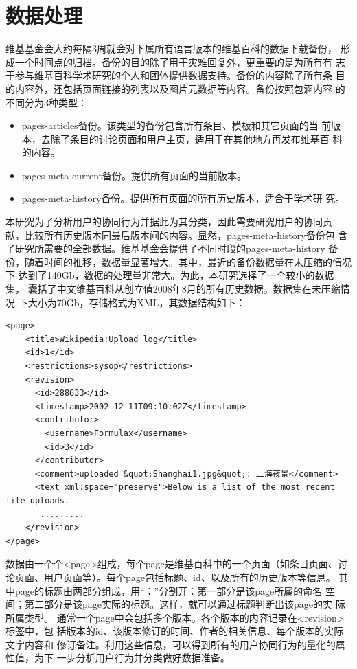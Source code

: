 \section{数据处理}
\label{sec:wikimedia-data}

维基基金会大约每隔3周就会对下属所有语言版本的维基百科的数据下载备份，
形成一个时间点的归档。备份的目的除了用于灾难回复外，更重要的是为所有有
志于参与维基百科学术研究的个人和团体提供数据支持。备份的内容除了所有条
目的内容外，还包括页面链接的列表以及图片元数据等内容。备份按照包涵内容
的不同分为3种类型：
\begin{itemize}
\item pages-articles备份。该类型的备份包含所有条目、模板和其它页面的当
  前版本，去除了条目的讨论页面和用户主页，适用于在其他地方再发布维基百
  科的内容。
\item pages-meta-current备份。提供所有页面的当前版本。
\item pages-meta-history备份。提供所有页面的所有历史版本，适合于学术研
  究。
\end{itemize}

本研究为了分析用户的协同行为并据此为其分类，因此需要研究用户的协同贡
献，比较所有历史版本同最后版本间的内容。显然，pages-meta-history备份包
含了研究所需要的全部数据。维基基金会提供了不同时段的pages-meta-history
备份，随着时间的推移，数据量显著增大。其中，最近的备份数据量在未压缩的情况下
达到了140Gb，数据的处理量非常大。为此，本研究选择了一个较小的数据集，
囊括了中文维基百科从创立值2008年8月的所有历史数据。数据集在未压缩情况
下大小为70Gb，存储格式为XML，其数据结构如下：

\begin{verbatim}
<page>
    <title>Wikipedia:Upload log</title>
    <id>1</id>
    <restrictions>sysop</restrictions>
    <revision>
      <id>288633</id>
      <timestamp>2002-12-11T09:10:02Z</timestamp>
      <contributor>
        <username>Formulax</username>
        <id>3</id>
      </contributor>
      <comment>uploaded &quot;Shanghai1.jpg&quot;: 上海夜景</comment>
      <text xml:space="preserve">Below is a list of the most recent file uploads.
       .........
    </revision>
</page>
\end{verbatim}

数据由一个个<page>组成，每个page是维基百科中的一个页面（如条目页面、讨
论页面、用户页面等）。每个page包括标题、id、以及所有的历史版本等信息。
其中page的标题由两部分组成，用“：”分割开：第一部分是该page所属的命名
空间；第二部分是该page实际的标题。这样，就可以通过标题判断出该page的实
际所属类型。
通常一个page中会包括多个版本。各个版本的内容记录在<revision>标签中，包
括版本的id、该版本修订的时间、作者的相关信息、每个版本的实际文字内容和
修订备注。利用这些信息，可以得到所有的用户协同行为的量化的属性值，为下
一步分析用户行为并分类做好数据准备。

